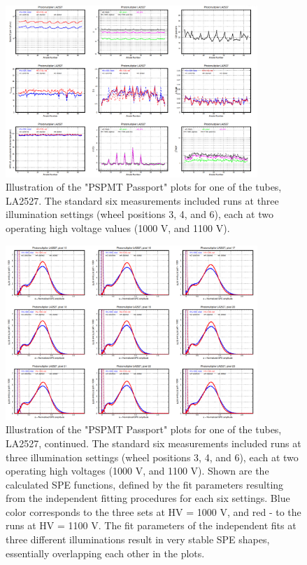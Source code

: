 \begin{figure}
	\centering
	\includegraphics[width=0.85\textwidth]{figures/pavel_temp/LA2527_passport_temp.png}
	\caption{Illustration of the "PSPMT Passport" plots for one of the tubes, LA2527. The standard six measurements included runs at three illumination settings (wheel positions 3, 4, and 6), each at two operating high voltage values (1000 V, and 1100 V).}
	\label{fig:LA2527_passport}
\end{figure}


\begin{figure}
	\centering
	\includegraphics[width=0.85\textwidth]{figures/pavel_temp/LA2527_spectra_temp.png}
	\caption{Illustration of the "PSPMT Passport" plots for one of the tubes, LA2527, continued. The standard six measurements included runs at three illumination settings (wheel positions 3, 4, and 6), each at two operating high voltages (1000 V, and 1100 V). Shown are the calculated SPE functions, defined by the fit parameters resulting from the independent fitting procedures for each six settings. Blue color corresponds to the three sets at HV = 1000 V, and red - to the runs at HV = 1100 V. The fit parameters of the independent fits at three different illuminations result in very stable SPE shapes, essentially overlapping each other in the plots.}
	\label{fig:LA2527_passport_spectra}
\end{figure}

